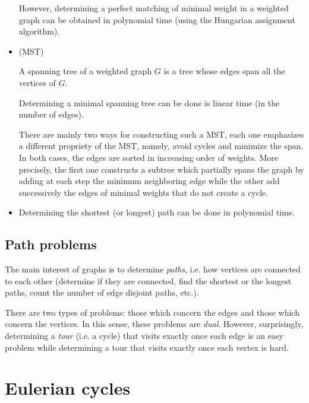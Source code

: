 \begin{itemize}
However, determining a perfect matching of minimal weight in a weighted graph can be obtained in polynomial time (using the Hungarian assignment algorithm). 

\item
{} (MST)

A spanning tree of a weighted graph $G$ is a tree whose edges span all the vertices of $G$.
\bigskip

Determining a minimal spanning tree can be done is linear time (in the number of edges).

There are mainly two ways for constructing such a MST, each one emphasizes a different propriety of the MST, namely, avoid cycles and minimize the span.
In both cases, the edges are sorted in increasing order of weights.
More precisely, the first one constructs a subtree which partially spans the graph by adding at each step the minimum neighboring edge 
while the other add successively the edges of minimal weights that do not create a cycle.
\item
{}

Determining the shortest (or longest) path can be done in polynomial time.
\end{itemize}



\subsection{Path problems}

The main interest of graphs is to determine \textit{paths}, i.e. how vertices are connected to each other (determine if they are connected, find the shortest or the longest paths, count the number of edge disjoint paths, etc.). 

There are two types of problems: those which concern the edges and those which concern the vertices. 
In this sense, these problems are \textit{dual}.
However, surprisingly, determining a \textit{tour} (i.e. a cycle) that visits exactly once each edge is an easy problem
 while determining a tour that visits exactly once each vertex is hard. 



\section{Eulerian cycles}
\label{sec:eulerianCycle}

